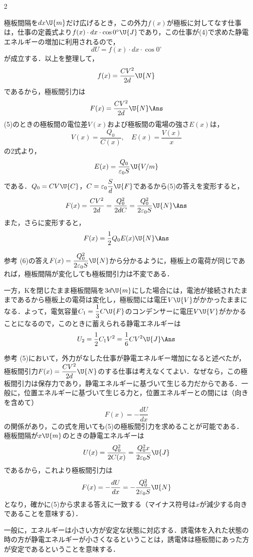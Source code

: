 \begin{multicols}{2}
\begin{komon}
       極板間隔を$dx\U{m}$だけ広げるとき，この外力$f(x)$が極板に対してなす仕事は，仕事の定義式より$f(x)\cdot dx\cdot\cos 0^\circ\U{J}$であり，この仕事が(4)で求めた静電エネルギーの増加に利用されるので，
       \[dU=f(x)\cdot dx\cdot\cos 0^\circ\]
       が成立する．以上を整理して，
       \[f(x)=\frac{CV^2}{2d}\U{N}\]
       であるから，極板間引力は
       \[F(x)=\frac{CV^2}{2d}\U{N}\Ans\]
 (5)のときの極板間の電位差$V(x)$および極板間の電場の強さ$E(x)$は，
       \[V(x)=\frac{Q_0}{C(x)},\quad E(x)=\frac{V(x)}{x}\]
       の2式より，
       \[E(x)=\frac{Q_0}{\varepsilon_0S}\U{V/m}\]
       である．$Q_0=CV\U{C}$，$C=\varepsilon_0\dfrac{S}{d}\U{F}$であるから(5)の答えを変形すると，
       \[F(x)=\frac{CV^2}{2d}=\frac{Q_0^2}{2dC}=\frac{Q_0^2}{2\varepsilon_0S}\U{N}\Ans\]
       また，さらに変形すると，
       \[F(x)=\frac{1}{2}Q_0E(x)\U{N}\Ans\]
       \begin{bsHosoku}{参考}
       (6)の答え$F(x)=\dfrac{Q_0^2}{2\varepsilon_0S}\U{N}$から分かるように，{\gtfamily 極板上の電荷が同じであれば，極板間隔が変化しても極板間引力は不変である}．
       \end{bsHosoku}
 一方，$\mathrm{K}$を閉じたまま極板間隔を$3d\U{m}$にした場合には，電池が接続されたままであるから極板上の電荷は変化し，極板間には電圧$V\U{V}$がかかったままになる．よって，電気容量$C_1=\dfrac{1}{3}C\U{F}$のコンデンサーに電圧$V\U{V}$がかかることになるので，このときに蓄えられる静電エネルギーは
       \[U_2=\frac{1}{2}C_1V^2=\frac{1}{6}CV^2\U{J}\Ans\]
       \begin{bsHosoku}{参考}
       (5)において，外力がなした仕事が静電エネルギー増加になると述べたが，極板間引力$F(x)=\dfrac{CV^2}{2d}\U{N}$のする仕事は考えなくてよい．なぜなら，この極板間引力は保存力であり，静電エネルギーに基づいて生じる力だからである．一般に，位置エネルギーに基づいて生じる力と，位置エネルギーとの間には（向きを含めて）
       \[F(x)=-\frac{dU}{dx}\]
       の関係があり，この式を用いても(5)の極板間引力を求めることが可能である．極板間隔が$x\U{m}$のときの静電エネルギーは
       \[U(x)=\frac{Q_0^2}{2C(x)}=\frac{Q_0^2x}{2\varepsilon_0S}\U{J}\]
       であるから，これより極板間引力は
       \[F(x)=-\frac{dU}{dx}=-\frac{Q_0^2}{2\varepsilon_0S}\U{N}\]
       となり，確かに(5)から求まる答えに一致する（マイナス符号は$x$が減少する向きであることを意味する）．
       \end{bsHosoku}
\end{komon}

\par\nopagebreak
\begin{sisin}
一般に，エネルギーは小さい方が安定な状態に対応する．誘電体を入れた状態の時の方が静電エネルギーが小さくなるということは，誘電体は極板間にあった方が安定であるということを意味する．


\end{sisin}
\end{multicols}
